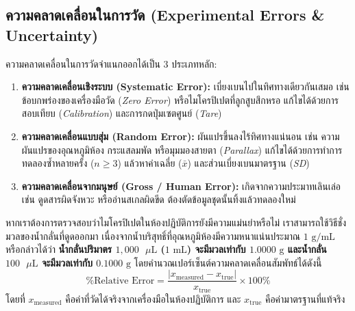 \subsection{ความคลาดเคลื่อนในการวัด (Experimental Errors \& Uncertainty)}

ความคลาดเคลื่อนในการวัดจำแนกออกได้เป็น 3 ประเภทหลัก:
\begin{enumerate}
    \item \textbf{ความคลาดเคลื่อนเชิงระบบ (Systematic Error):} เบี่ยงเบนไปในทิศทางเดียวกันเสมอ เช่น ข้อบกพร่องของเครื่องมือวัด (\textit{Zero Error}) หรือไมโครปิเปตที่ลูกสูบสึกหรอ แก้ไขได้ด้วยการสอบเทียบ (\textit{Calibration}) และการกดปุ่มเซตศูนย์ (\textit{Tare})
    \item \textbf{ความคลาดเคลื่อนแบบสุ่ม (Random Error):} ผันแปรขึ้นลงไร้ทิศทางแน่นอน เช่น ความผันแปรของอุณหภูมิห้อง กระแสลมพัด หรือมุมมองสายตา (\textit{Parallax}) แก้ไขได้ด้วยการทำการทดลองซ้ำหลายครั้ง ($n \ge 3$) แล้วหาค่าเฉลี่ย ($\bar{x}$) และส่วนเบี่ยงเบนมาตรฐาน (\textit{SD})
    \item \textbf{ความคลาดเคลื่อนจากมนุษย์ (Gross / Human Error):} เกิดจากความประมาทเลินเล่อ เช่น ดูดสารผิดจังหวะ หรืออ่านสเกลผิดขีด ต้องตัดข้อมูลชุดนั้นทิ้งแล้วทดลองใหม่
\end{enumerate}



หากเราต้องการตรวจสอบว่าไมโครปิเปตในห้องปฏิบัติการยังมีความแม่นยำหรือไม่ เราสามารถใช้วิธีชั่งมวลของน้ำกลั่นที่ดูดออกมา เนื่องจากน้ำบริสุทธิ์ที่อุณหภูมิห้องมีความหนาแน่นประมาณ $1\text{ g/mL}$ หรือกล่าวได้ว่า \textbf{น้ำกลั่นปริมาตร $1{,}000\text{ }\mu\text{L}$ ($1\text{ mL}$) จะมีมวลเท่ากับ $1.0000\text{ g}$ และน้ำกลั่น $100\text{ }\mu\text{L}$ จะมีมวลเท่ากับ $0.1000\text{ g}$} โดยคำนวณเปอร์เซ็นต์ความคลาดเคลื่อนสัมพัทธ์ได้ดังนี้
\begin{equation*}
    \% \text{Relative Error} = \frac{|x_{\text{measured}} - x_{\text{true}}|}{x_{\text{true}}} \times 100\%
\end{equation*}
โดยที่ $x_{\text{measured}}$ คือค่าที่วัดได้จริงจากเครื่องมือในห้องปฏิบัติการ และ $x_{\text{true}}$ คือค่ามาตรฐานที่แท้จริง

